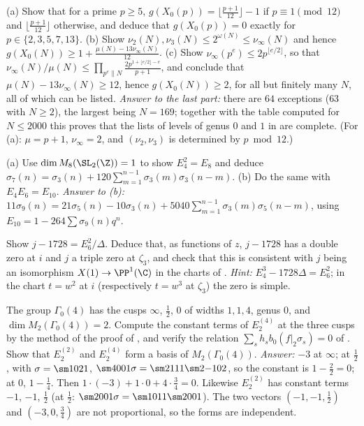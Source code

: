 \begin{exercise}\label{ex:modforms:ex-genus-bound}
(a) Show that for a prime $p\ge5$, $g(X_0(p))=\lfloor\frac{p+1}{12}\rfloor-1$ if $p\equiv1\pmod{12}$ and $\lfloor\frac{p+1}{12}\rfloor$ otherwise, and deduce that $g(X_0(p))=0$ exactly for
$p\in\{2,3,5,7,13\}$. (b) Show $\nu_2(N),\nu_3(N)\le2^{\omega(N)}\le\nu_\infty(N)$ and hence $g(X_0(N))\ge1+\frac{\mu(N)-13\nu_\infty(N)}{12}$. (c) Show $\nu_\infty(p^e)\le2p^{\lfloor e/2\rfloor}$, so that
$\nu_\infty(N)/\mu(N)\le\prod_{p^e\|N}\frac{2p^{1+\lfloor e/2\rfloor-e}}{p+1}$, and conclude that $\mu(N)-13\nu_\infty(N)\ge12$, hence $g(X_0(N))\ge2$, for all but finitely many $N$, all of which
can be listed. \emph{Answer to the last part:} there are $64$ exceptions ($63$ with $N\ge2$), the largest being $N=169$; together with the table computed for $N\le2000$ this proves that the lists of
levels of genus $0$ and $1$ in  are complete. (For (a): $\mu=p+1$, $\nu_\infty=2$, and $(\nu_2,\nu_3)$ is determined by $p\bmod12$.)
\end{exercise}

\begin{exercise}\label{ex:modforms:ex-sigma}
(a) Use $\dim M_8(\SL_2(\Z))=1$ to show $E_4^2=E_8$ and deduce $\sigma_7(n)=\sigma_3(n)+120\sum_{m=1}^{n-1}\sigma_3(m)\sigma_3(n-m)$. (b) Do the same with $E_4E_6=E_{10}$.
\emph{Answer to (b):} $11\sigma_9(n)=21\sigma_5(n)-10\sigma_3(n)+5040\sum_{m=1}^{n-1}\sigma_3(m)\sigma_5(n-m)$, using $E_{10}=1-264\sum\sigma_9(n)q^n$.
\end{exercise}

\begin{exercise}\label{ex:modforms:ex-j1728}
Show $j-1728=E_6^2/\Delta$. Deduce that, as functions of $z$, $j-1728$ has a double zero at $i$ and $j$ a triple zero at $\zeta_3$, and check that this is consistent with $j$ being an
isomorphism $X(1)\to\PP^1(\C)$ in the charts of .
\emph{Hint:} $E_4^3-1728\Delta=E_6^2$; in the chart $t=w^2$ at $i$ (respectively $t=w^3$ at $\zeta_3$) the zero is simple.
\end{exercise}

\begin{exercise}\label{ex:modforms:ex-residue}
The group $\Gamma_0(4)$ has the cusps $\infty$, $\frac12$, $0$ of widths $1,1,4$, genus $0$, and $\dim M_2(\Gamma_0(4))=2$. Compute the constant terms of $E_2^{(4)}$ at the three cusps by the method of
the proof of , and verify the relation $\sum_sh_sb_0(f|_2\sigma_s)=0$ of . Show that $E_2^{(2)}$ and $E_2^{(4)}$ form a
basis of $M_2(\Gamma_0(4))$.
\emph{Answer:} $-3$ at $\infty$; at $\frac12$, with $\sigma=\sm1021$, $\sm4001\sigma=\sm2111\sm2{-1}02$, so the constant is $1-\frac22=0$; at $0$, $1-\frac14$. Then
$1\cdot(-3)+1\cdot0+4\cdot\frac34=0$. Likewise $E_2^{(2)}$ has constant terms $-1$, $-1$, $\frac12$ (at $\frac12$: $\sm2001\sigma=\sm1011\sm2001$). The two vectors $(-1,-1,\frac12)$ and
$(-3,0,\frac34)$ are not proportional, so the forms are independent.
\end{exercise}

